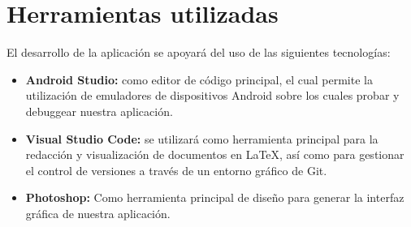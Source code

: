 \section{Herramientas utilizadas}

El desarrollo de la aplicación se apoyará del uso de las siguientes tecnologías:

\begin{itemize}
    \item \textbf{Android Studio:} como editor de código principal, el cual permite la utilización de emuladores de dispositivos Android sobre los cuales probar y debuggear nuestra aplicación.
    \item \textbf{Visual Studio Code:} se utilizará como herramienta principal para la redacción y visualización de documentos en LaTeX, así como para gestionar el control de versiones a través de un entorno gráfico de Git.
    \item \textbf{Photoshop:} Como herramienta principal de diseño para generar la interfaz gráfica de nuestra aplicación.
\end{itemize}
	
\cleardoublepage